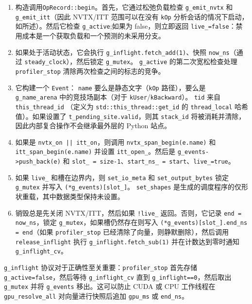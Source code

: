\begin{enumerate}[leftmargin=1.4em]
\item 构造调用\texttt{OpRecord::begin}。首先，它通过松弛负载检查 \texttt{g\_emit\_nvtx} 和 \texttt{g\_emit\_itt}（因此 NVTX/ITT 范围可以在没有 \texttt{kOp} 分析会话的情况下启动，如所述）。然后它检查 \texttt{g\_active};如果为 false，则立即返回 \texttt{live\_=false}：禁用成本是一个获取负载和一个预测的未采用分支。
\item 如果处于活动状态，它会执行 \texttt{g\_inflight.fetch\_add(1)}、快照 \texttt{now\_ns}（通过 \texttt{steady\_clock}），然后锁定 \texttt{g\_mutex}。 \texttt{g\_active} 的第二次宽松检查处理 \texttt{profiler\_stop} 清除两次检查之间的标志的竞争。
\item 它构建一个 \texttt{Event}： \texttt{name} 要么是静态文字（\texttt{kOp} 路径），要么是 \texttt{g\_name\_arena} 中的竞技场副本（对于 \texttt{kUser}/\texttt{kBackward}）。 \texttt{tid} 来自 \texttt{this\_thread\_id} （定义为 \texttt{std::this\_thread::get\_id} 的 \texttt{thread\_local} 哈希值）。如果设置了 \texttt{t\_pending\_site.valid}，则其 \texttt{stack\_id} 将被消耗并清除，因此内部复合操作不会继承最外层的 Python 站点。
\item 如果是 \texttt{nvtx\_on || itt\_on}，则调用 \texttt{nvtx\_span\_begin(e.name)} 和 \texttt{itt\_span\_begin(e.name)} 并设置 \texttt{itt\_open\_}。然后是 \texttt{g\_events->push\_back(e)} 和 \texttt{slot\_ = size-1}、\texttt{start\_ns\_ = start}、\texttt{live\_=true}。
\item 如果 \texttt{live\_} 和槽在边界内，则 \texttt{set\_io\_meta} 和 \texttt{set\_output\_bytes} 锁定 \texttt{g\_mutex} 并写入 \texttt{(*g\_events)[slot\_]}。 \texttt{set\_shapes} 是生成的调度程序的仅形状重载，其中数据类型保持未设置。
\item 销毁总是先关闭 NVTX/ITT，然后如果 \texttt{!live\_} 返回。否则，它记录 \texttt{end = now\_ns}，锁定 \texttt{g\_mutex}，如果槽仍然存在则写入 \texttt{(*g\_events)[slot\_].end\_ns = end}（如果 \texttt{profiler\_stop} 已经清除了向量，则静默删除），然后调用 \texttt{release\_inflight} 执行 \texttt{g\_inflight.fetch\_sub(1)} 并在计数达到零时通知 \texttt{g\_inflight\_cv}。
\end{enumerate}

\texttt{g\_inflight} 协议对于正确性至关重要：\texttt{profiler\_stop} 首先存储 \texttt{g\_active=false}，然后等待 \texttt{g\_inflight\_cv} 直到 \texttt{g\_inflight==0}，然后取出 \texttt{g\_mutex} 并将 \texttt{g\_events} 移出。这可以防止 CUDA 或 CPU 工作线程在 \texttt{gpu\_resolve\_all} 对向量进行快照后追加 \texttt{gpu\_ms} 或 \texttt{end\_ns}。

